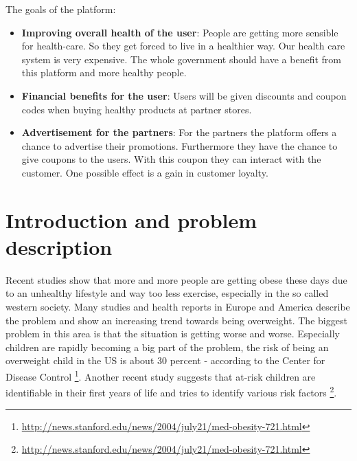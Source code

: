 \documentclass[a4paper,11pt]{article}
\providecommand*{\note}[1]{\small \textcolor{RoyalBlue}{\begin{minipage}{\textwidth}{#1}\end{minipage}}}
\begin{document}
The goals of the platform:
\begin{itemize}
\item \textbf{Improving overall health of the user}: People are getting more sensible for health-care. So they get forced to live in a healthier way. Our health care system is very expensive. The whole government should have a benefit from this platform and more healthy people. 
\item \textbf{Financial benefits for the user}: Users will be given discounts and coupon codes when buying healthy products at partner stores. 
\item \textbf{Advertisement for the partners}: For the partners the platform offers a chance to advertise their promotions. Furthermore they have the chance to give coupons to the users. With this coupon they can interact with the customer. One possible effect is a gain in customer loyalty.

\end{itemize}

\pagebreak

\section{Introduction and problem description}
\label{sect:intro}


Recent studies \citep{euobes2003} show that more and more people are getting obese these days due to an unhealthy lifestyle and way too less exercise, especially in the so called western society. Many studies and health reports in Europe and America describe the problem and show an increasing trend towards being overweight. The biggest problem in this area is that the situation is getting worse and worse. Especially children are rapidly becoming a big part of the problem, the risk of being an overweight child in the US is about 30 percent - according to the Center for Disease Control \footnote{\url{http://news.stanford.edu/news/2004/july21/med-obesity-721.html}}. Another recent study suggests that at-risk children are identifiable in their first years of life and tries to identify various risk factors \footnote{\url{http://news.stanford.edu/news/2004/july21/med-obesity-721.html}}. \\
\end{document}
